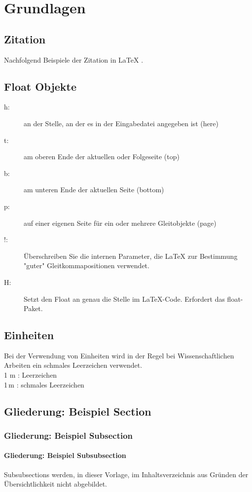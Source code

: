 \chapter{Grundlagen}
\label{sec:grundlagen}

\section{Zitation}
Nachfolgend Beispiele der Zitation in {\LaTeX} \cite{yang_application_2003}.
\blindtext
\cite{test}
\blindtext
\cite{kroll_computational_2016, yang_application_2003}


\section{Float Objekte}


\begin{description}
	\item[h:] an der Stelle, an der es in der Eingabedatei angegeben ist (here)
	\item[t:] am oberen Ende der aktuellen oder Folgeseite (top)
	\item[b:] am unteren Ende der aktuellen Seite (bottom)
	\item[p:] auf einer eigenen Seite für ein oder mehrere Gleitobjekte (page)
	\item[!:] Überschreiben Sie die internen Parameter, die LaTeX zur Bestimmung "guter" Gleitkommapositionen verwendet.
	\item[H:] Setzt den Float an genau die Stelle im LaTeX-Code. Erfordert das float-Paket.
\end{description}

\section{Einheiten}
Bei der Verwendung von Einheiten wird in der Regel bei Wissenschaftlichen Arbeiten ein schmales Leerzeichen verwendet.\\
1 m : Leerzeichen \\
1\,m : schmales Leerzeichen \\

\section{Gliederung: Beispiel Section}
\subsection{Gliederung: Beispiel Subsection}
\subsubsection{Gliederung: Beispiel Subsubsection}
Subsubsections werden, in dieser Vorlage, im Inhaltsverzeichnis aus Gründen der Übersichtlichkeit nicht abgebildet.